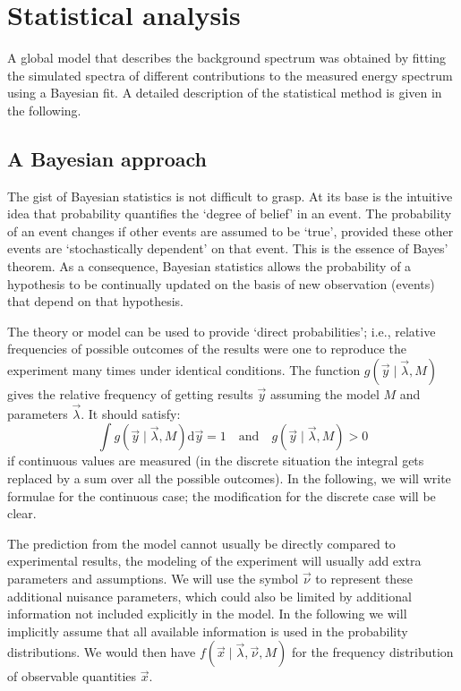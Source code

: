 \chapter{Statistical analysis}
A global model that describes the background spectrum was obtained by fitting the simulated spectra of different contributions to the measured energy spectrum using a Bayesian fit. A detailed description of the statistical method is given in the following.
\section*{A Bayesian approach}
The gist of Bayesian statistics is not difficult to grasp. At its base is the intuitive idea that probability quantifies the `degree of belief' in an event. The probability of an event changes if other events are assumed to be `true', provided these other events are `stochastically dependent' on that event. This is the essence of Bayes' theorem. As a consequence, Bayesian statistics allows the probability of a hypothesis to be continually updated on the basis of new observation (events) that depend on that hypothesis. 

 The theory or model can be used to provide `direct probabilities'; i.e., relative frequencies of possible outcomes of the results were one to reproduce the experiment many times under identical conditions. The function $g(\vec{y}\mid\vec{\lambda},M)$ gives the relative frequency of getting results $\vec{y}$ assuming the model $M$ and parameters $\vec{\lambda}$. It should satisfy:
\[\int g(\vec{y}\mid\vec{\lambda},M)\text{d}\vec{y}=1 \quad\text{and}\quad g(\vec{y}\mid\vec{\lambda},M)>0\]
if continuous values are measured (in the discrete situation the integral gets replaced by a sum over all the possible outcomes). In the following, we will write formulae for the continuous case; the modification for the discrete case will be clear.

The prediction from the model cannot usually be directly compared to experimental results, the modeling of the experiment will usually add extra parameters and assumptions. We will use the symbol $\vec{\nu}$ to represent these additional nuisance parameters, which could also be limited by additional information not included explicitly in the model. In the following we will implicitly assume that all available information is used in the probability distributions. We would then have $f(\vec{x}\mid\vec{\lambda},\vec{\nu},M)$ for the frequency distribution of observable quantities $\vec{x}$.

